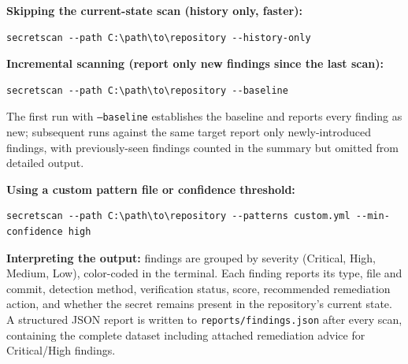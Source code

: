 \documentclass[12pt]{article}
\begin{document}
\textbf{Skipping the current-state scan (history only, faster):}
\begin{verbatim}
secretscan --path C:\path\to\repository --history-only
\end{verbatim}

\textbf{Incremental scanning (report only new findings since the last scan):}
\begin{verbatim}
secretscan --path C:\path\to\repository --baseline
\end{verbatim}
The first run with \texttt{--baseline} establishes the baseline and reports every finding as new; subsequent runs against the same target report only newly-introduced findings, with previously-seen findings counted in the summary but omitted from detailed output.

\textbf{Using a custom pattern file or confidence threshold:}
\begin{verbatim}
secretscan --path C:\path\to\repository --patterns custom.yml --min-confidence high
\end{verbatim}

\textbf{Interpreting the output:} findings are grouped by severity (Critical, High, Medium, Low), color-coded in the terminal. Each finding reports its type, file and commit, detection method, verification status, score, recommended remediation action, and whether the secret remains present in the repository's current state. A structured JSON report is written to \texttt{reports/findings.json} after every scan, containing the complete dataset including attached remediation advice for Critical/High findings.
\end{document}
